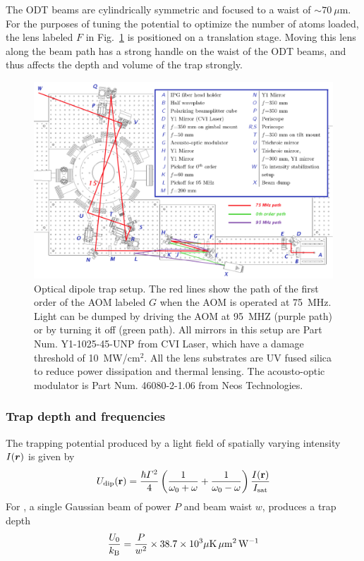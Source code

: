 The ODT beams are cylindrically symmetric and focused to a waist of
$\sim70~\mu$m.  For the purposes of tuning the potential to optimize the number
of atoms loaded, the lens labeled $F$ in Fig.~\ref{fig:odtsetup} is positioned
on a translation stage.  Moving this lens along the beam path has a strong
handle on the waist of the ODT beams, and thus affects the depth and volume of
the trap strongly.  
\begin{figure} \centering
\includegraphics[width=\textwidth]{../masters-figures/odt/opticalsetup/setup.pdf}
\caption[Optical dipole trap setup]{\small Optical dipole trap setup.  The red
lines show the path of the first order of the AOM labeled $G$ when the AOM is
operated at 75~MHz.   Light can be dumped by driving the AOM at 95~MHZ (purple
path) or by turning it off (green path). All mirrors in this setup are Part
Num. Y1-1025-45-UNP from CVI Laser, which have a damage threshold of
10~MW/cm$^{2}$.  All the lens substrates are UV fused silica to reduce power
dissipation and thermal lensing.  The acousto-optic modulator is Part Num.
46080-2-1.06 from Neos Technologies.  } \label{fig:odtsetup}
\end{figure}

\subsubsection{Trap depth and frequencies}

The trapping potential produced by a light field of spatially varying intensity
$I(\bm{r})$ is given by
\begin{equation}
 U_{\mathrm{dip}}(\mathrm{\mathbf{r}} ) =
\frac{\hbar \Gamma^{2}}{4} \left( \frac{1}{\omega_{0}+\omega} +
\frac{1}{\omega_{0}-\omega} \right) \frac{I(\mathrm{\mathbf{r}} )}{ I_{\mathrm{sat}} } 
\end{equation}
For \li\!\!, a single Gaussian beam of power $P$ and
beam waist $w$, produces a trap depth 
\begin{equation} 
  \frac{U_{0}}{k_{\mathrm{B}}}=\frac{P}{w^{2}} \times
  38.7\times10^{3}  \mu\mathrm{K}\, \mu \mathrm{m}^{2}\, \mathrm{W}^{-1} 
\end{equation}


